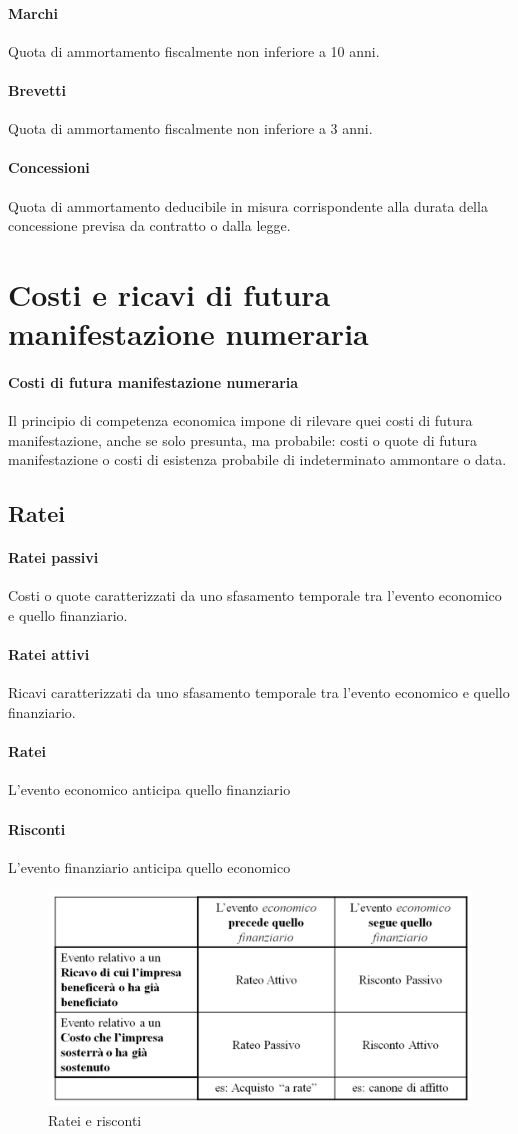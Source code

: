 \documentclass{report}
\begin{document}
	\paragraph{Marchi} Quota di ammortamento fiscalmente non inferiore a 10 anni.
	\paragraph{Brevetti} Quota di ammortamento fiscalmente non inferiore a 3 anni.
	\paragraph{Concessioni} Quota di ammortamento deducibile in misura corrispondente alla durata della concessione previsa da contratto o dalla legge.
	\section{Costi e ricavi di futura manifestazione numeraria}
	\paragraph{Costi di futura manifestazione numeraria} Il principio di competenza economica impone di rilevare quei costi di futura manifestazione, anche se solo presunta, ma probabile: costi o quote di futura manifestazione o costi di esistenza probabile di indeterminato ammontare o data.
	\subsection{Ratei}
	\paragraph{Ratei passivi} Costi o quote caratterizzati da uno sfasamento temporale tra l'evento economico e quello finanziario.
	\paragraph{Ratei attivi} Ricavi caratterizzati da uno sfasamento temporale tra l'evento economico e quello finanziario.
	\paragraph{Ratei} L'evento economico anticipa quello finanziario
	\paragraph{Risconti} L'evento finanziario anticipa quello economico
	\begin{figure}[h]
		\centering
		\includegraphics[width=0.7\linewidth]{images/ratei-risconti}
		\caption{Ratei e risconti}
		\label{fig:ratei-risconti}
	\end{figure}
\end{document}
